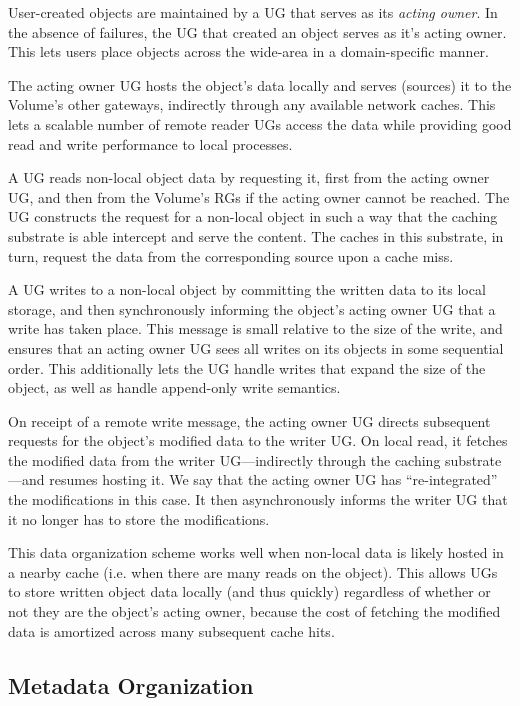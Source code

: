 User-created objects are maintained by a UG that serves as its \textit{acting owner}. In the absence of failures, the UG that created an object serves as it's acting owner. This lets users place objects across the wide-area in a domain-specific manner.

The acting owner UG hosts the object's data locally and serves (sources) it to the Volume's other gateways, indirectly through any available network caches. This lets a scalable number of remote reader UGs access the data while providing good read and write performance to local processes.

A UG reads non-local object data by requesting it, first from the acting owner UG, and then from the Volume's RGs if the acting owner cannot be reached. The UG constructs the request for a non-local object in such a way that the caching substrate is able intercept and serve the content. The caches in this substrate, in turn, request the data from the corresponding source upon a cache miss.

A UG writes to a non-local object by committing the written data to its local storage, and then synchronously informing the object's acting owner UG that a write has taken place. This message is small relative to the size of the write, and ensures that an acting owner UG sees all writes on its objects in some sequential order. This additionally lets the UG handle writes that expand the size of the object, as well as handle append-only write semantics.

On receipt of a remote write message, the acting owner UG directs subsequent requests for the object's modified data to the writer UG. On local read, it fetches the modified data from the writer UG---indirectly through the caching substrate---and resumes hosting it. We say that the acting owner UG has ``re-integrated'' the modifications in this case. It then asynchronously informs the writer UG that it no longer has to store the modifications.

This data organization scheme works well when non-local data is likely hosted in a nearby cache (i.e. when there are many reads on the object). This allows UGs to store written object data locally (and thus quickly) regardless of whether or not they are the object's acting owner, because the cost of fetching the modified data is amortized across many subsequent cache hits.

\subsection{Metadata Organization}

